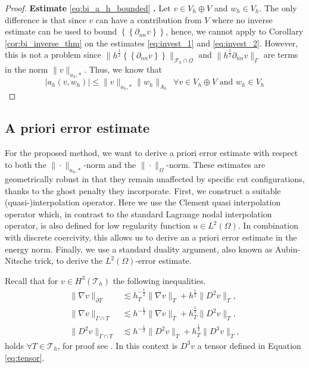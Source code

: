 \documentclass[11pt]{article}
\theoremstyle{remark}
\newcommand{\mean}[1]{\left\{\!\!\left\{#1\right\}\!\!\right\}}
\newcommand{\abs}[1]{\left\lvert #1 \right\rvert}
\renewcommand{\le}{\leqslant}
\numberwithin{equation}{section}
\begin{document}
\begin{proof}
             \textbf{Estimate }\eqref{eq:bi_a_h_bounded} \textbf{.} Let $v \in V_{h} \oplus V $ and $w_{h} \in V_{h}$.
             The only difference is that since $v$ can have a contribution from $V$ where no inverse estimate can be used to bound $\mean{ \partial _{nn} v }  $, hence, we cannot apply to Corollary \ref{cor:bi_inverse_thm} on the estimates \eqref{eq:invest_1} and \eqref{eq:invest_2}. However, this is not a problem since $\| h^{\frac{1}{2}} \mean{ \partial _{nn} v }
             \|_{\mathcal{F} _{h}\cap  \Omega   }^{  } $ and  $\|h^{\frac{1}{2}}  \partial _{nn}v \|_{\Gamma   }^{  } $ are terms in the norm $\|  v \|_{a_{h},*  }^{  } $. Thus, we know that
             \begin{equation}
                  \abs{ a_{h}( v,w_{h}) }  \le \| v \|_{ a_{h},* }^{  } \| w_{h} \|_{ A_{h} }^{  } \ \ \forall v \in V_{h} \oplus V \text{ and } w_{h} \in V_{h}
             \end{equation}

\end{proof}




\subsection{A priori error estimate}%
\label{sec:a_priori_estimates}


For the proposed method, we want to derive a priori error estimate with respect to both the  $\| \cdot  \|_{a_{h},*   }^{  } $-norm and the  $\| \cdot  \|_{ \Omega  }^{
} $-norm.  These estimates are geometrically robust in that they remain unaffected by specific cut configurations, thanks to the ghost penalty they incorporate.
First, we construct a suitable (quasi-)interpolation operator. Here we use the Clement quasi interpolation operator which, in contrast to the standard Lagrange nodal interpolation operator, is also defined for low regularity function $u \in L^{2}(
\Omega ) $.
In combination with discrete coercivity, this allows us to derive an a priori error estimate in the energy norm. Finally, we use a standard duality argument, also known as Aubin-Nitsche trick, to derive the $L^{2}( \Omega ) $-error estimate.

Recall that for $v \in H^{3}( \mathcal{T } _{h}) $ the following inequalities.
\begin{align}
    \label{eq:trace:1}
    \| \nabla v \|_{ \partial T }^{  } &\lesssim h^{-\frac{1}{2}}_{T}\|  \nabla v \|_{ T }^{  }+ h^{\frac{1}{2}} \| D^2 v \|_{T  }^{   }  , \\
    \label{eq:trace:2}
    \| \nabla v \|_{ \Gamma \cap T }^{  } &\lesssim  h^{-\frac{1}{2}} \| \nabla v \|_{T  }^{  }   + h^{\frac{1}{2}}_{T} \| D^2 v \|_{ T }^{  },\\
    \label{eq:trace:3}
    \| D^2 v \|_{ \Gamma \cap T }^{  } &\lesssim  h^{-\frac{1}{2}} \| D^2 v \|_{T  }^{  }   + h^{\frac{1}{2}}_{T} \| D^3 v \|_{ T }^{  },
\end{align}
holds $\forall T \in \mathcal{T} _{h}$, for proof see \cite[Lemma 4.2]{hansbo2003finite}. In this context is $D^3v$ a tensor defined in Equation \eqref{eq:tensor}.
\end{document}
